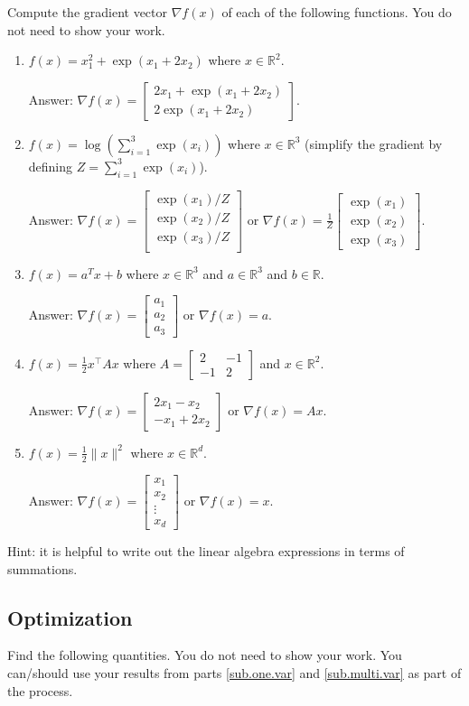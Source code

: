 \documentclass{article}
\def\ans#1{\par\gre{Answer: #1}}
\def\blu#1{{\color{blu}#1}}
\def\gre#1{{\color{gre}#1}}
\def\norm#1{\|#1\|}
\def\R{\mathbb{R}}
\newcommand{\mat}[1]{\begin{bmatrix}#1\end{bmatrix}}
\def\half{\frac 1 2}
\begin{document}
	\blu{Compute the gradient vector $\nabla f(x)$ of each of the following functions.} You do not need to show your work.
	\begin{enumerate}
		\item $f(x) = x_1^2 + \exp(x_1 + 2x_2)$ where $x \in \R^2$.
		\ans{$\nabla f(x) = \mat{2x_1 + \exp(x_1+2x_2)\\ 2\exp(x_1 + 2x_2)}$.}
		\item $f(x) = \log\left(\sum_{i=1}^3\exp(x_i)\right)$ where $x \in \R^3$ (simplify the gradient by defining $Z = \sum_{i=1}^3\exp(x_i)$).
		\ans{$\nabla f(x) = \mat{\exp(x_1)/Z\\\exp(x_2)/Z\\\exp(x_3)/Z\\}$ or $\nabla f(x) = \frac{1}{Z}\mat{\exp(x_1)\\\exp(x_2)\\\exp(x_3)}$.}
		\item $f(x) = a^Tx + b$ where $x \in \R^3$ and $a \in \R^3$ and $b \in \R$.
		\ans{$\nabla f(x) = \mat{a_1 \\a_2\\a_3}$ or  $\nabla f(x) = a$.}
		\item $f(x) = \half x^\top A x$ where $A=\left[ \begin{array}{cc}
			2 & -1 \\
			-1 & 2 \end{array} \right]$ and $x \in \mathbb{R}^2$.
		\ans{$\nabla f(x) = \mat{2x_1 - x_2\\-x_1 + 2x_2}$ or  $\nabla f(x) = Ax.$}
		\item $f(x) = \frac{1}{2}\norm{x}^2$ where $x \in \R^d$.
		\ans{$\nabla f(x) = \mat{x_1\\x_2\\\vdots\\x_d}$ or $\nabla f(x) = x$.}
	\end{enumerate}
	
	Hint: it is helpful to write out the linear algebra expressions in terms of summations.
	
	
	\subsection{Optimization}
	\blu{Find the following quantities.} You do not need to show your work. 
	You can/should use your results from parts \ref{sub.one.var} and \ref{sub.multi.var} as part of the process.
	
\end{document}
